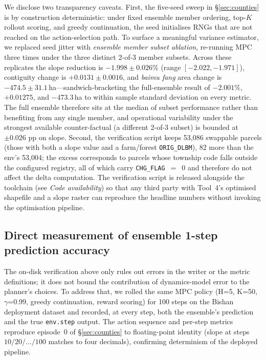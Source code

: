 \documentclass[11pt]{article}
\begin{document}
We disclose two transparency caveats. First, the five-seed sweep in \S\ref{sec:counties} is by construction deterministic: under fixed ensemble member ordering, top-$K$ rollout scoring, and greedy continuation, the seed initialises RNGs that are not reached on the action-selection path. To surface a meaningful variance estimator, we replaced seed jitter with \emph{ensemble member subset ablation}, re-running MPC three times under the three distinct 2-of-3 member subsets. Across these replicates the slope reduction is $-1.998 \pm 0.026\%$ (range $[-2.022, -1.971]$), contiguity change is $+0.0131 \pm 0.0016$, and \textit{baimu fang} area change is $-474.5 \pm 31.1$\,ha---sandwich-bracketing the full-ensemble result of $-2.001\%$, $+0.01275$, and $-473.3$\,ha to within sample standard deviation on every metric. The full ensemble therefore sits at the median of subset performance rather than benefiting from any single member, and operational variability under the strongest available counter-factual (a different 2-of-3 subset) is bounded at $\pm 0.026$ pp on slope. Second, the verification script keeps 53{,}086 swappable parcels (those with both a slope value and a farm/forest \texttt{ORIG\_DLBM}), 82 more than the env's 53{,}004; the excess corresponds to parcels whose township code falls outside the configured registry, all of which carry \texttt{CHG\_FLAG}~$=$~0 and therefore do not affect the delta computation. The verification script is released alongside the toolchain (see \emph{Code availability}) so that any third party with Tool~4's optimised shapefile and a slope raster can reproduce the headline numbers without invoking the optimisation pipeline.

\subsection*{Direct measurement of ensemble 1-step prediction accuracy}\label{sec:methods-mae}

The on-disk verification above only rules out errors in the writer or the metric definitions; it does not bound the contribution of dynamics-model error to the planner's choices. To address that, we rolled the same MPC policy (H=5, K=50, $\gamma$=0.99, greedy continuation, reward scoring) for 100 steps on the Bishan deployment dataset and recorded, at every step, both the ensemble's prediction and the true \texttt{env.step} output. The action sequence and per-step metrics reproduce episode~0 of \S\ref{sec:counties} to floating-point identity (slope at steps $10/20/\dots/100$ matches to four decimals), confirming determinism of the deployed pipeline.
\end{document}
